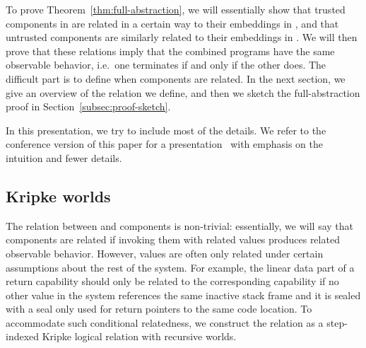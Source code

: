 To prove Theorem~\ref{thm:full-abstraction}, we will essentially show that trusted components in \srccm{} are related in a certain way to their embeddings in \trgcm{}, and that untrusted \trgcm{} components are similarly related to their embeddings in \srccm{}.
We will then prove that these relations imply that the combined programs have the same observable behavior, i.e.\ one terminates if and only if the other does.
The difficult part is to define when components are related.
In the next section, we give an overview of the relation we define, and then we sketch the full-abstraction proof in Section~\ref{subsec:proof-sketch}.
\begin{jversion}
In this presentation, we try to include most of the details.
We refer to the conference version of this paper for a presentation~\citep{skorstengaard_stktokens_2019} with emphasis on the intuition and fewer details.
\end{jversion}

\subsection{Kripke worlds}
\label{subsec:worlds}
The relation between \srccm{} and \trgcm{} components is non-trivial: essentially, we will say that components are related if invoking them with related values produces related observable behavior.
However, values are often only related under certain assumptions about the rest of the system.
For example, the linear data part of a return capability should only be related to the corresponding \srccm{} capability if no other value in the system references the same inactive stack frame and it is sealed with a seal only used for return pointers to the same code location.
To accommodate such conditional relatedness, we construct the relation as a step-indexed Kripke logical relation with recursive worlds.

